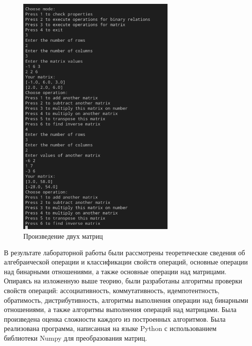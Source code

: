\documentclass[bachelor, och, labwork]{shiza}
\begin{document}
        \begin{figure}[H]
            \centering
            \includegraphics[width=0.7\textwidth]{photo/6.png}
            \caption{Произведение двух матриц}
        \end{figure} 
    \newpage
 
    \conclusion
    
    В результате лабораторной работы были рассмотрены теоретические сведения об алгебраической операции и классификации
    свойств операций, основные операции над бинарными отношениями, а также основные операции над матрицами. Опираясь на изложенную
    выше теорию, были разработаны алгоритмы проверки свойств операций: ассоциативность, коммутативность, идемпотентность, обратимость,
    дистрибутивность, алгоритмы выполнения операции над бинарными отношениями, а также алгоритмы выполнения операций над
    матрицами. Была произведена оценка сложности каждого из  построенных алгоритмов. Была реализована программа, написанная на языке Python
    с использованием библиотеки Numpy для преобразования матриц.
    
\end{document}
